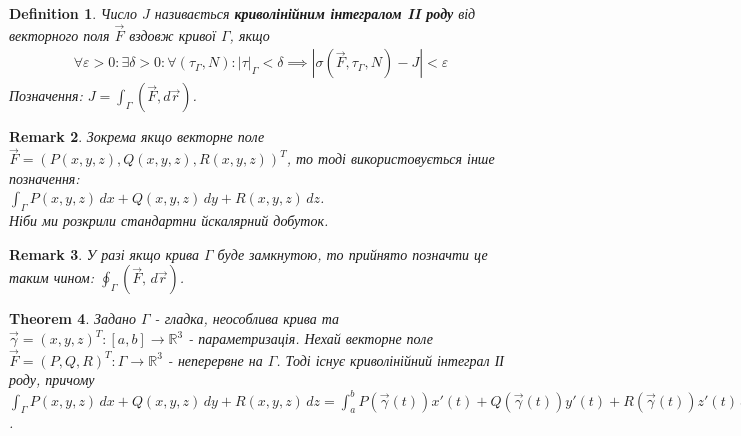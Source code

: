 \documentclass[a4paper, 10pt]{article}
\theoremstyle{theoremdd}
\newtheorem{theorem}{Theorem}[subsection]
\theoremstyle{theoremdd}
\newtheorem{definition}[theorem]{Definition}
\theoremstyle{theoremdd}
\theoremstyle{theoremdd}
\theoremstyle{theoremdd}
\theoremstyle{theoremdd}
\theoremstyle{theoremdd}
\theoremstyle{theoremdd}
\theoremstyle{theoremdd}
\newtheorem{proposition}[theorem]{Proposition}
\theoremstyle{theoremdd}
\theoremstyle{theoremdd}
\newtheorem{remark}[theorem]{Remark}
\theoremstyle{theoremdd}
\theoremstyle{theoremdd}
\theoremstyle{theoremdd}
\theoremstyle{theoremdd}
\newcommand\Norm[1]{\left\lVert#1\right\rVert}
\begin{document}
\begin{definition}
Число $J$ називається \textbf{криволінійним інтегралом II роду} від векторного поля $\vec{F}$ вздовж кривої $\Gamma$, якщо
\begin{align*}
\forall \varepsilon > 0: \exists \delta > 0: \forall (\tau_\Gamma, N): |\tau|_\Gamma < \delta \implies |\sigma(\vec{F},\tau_\Gamma, N) - J| < \varepsilon
\end{align*}
Позначення: $J = \displaystyle\int_\Gamma (\vec{F}, d\vec{r})$.
\end{definition}

\iffalse
\begin{proposition}
$\displaystyle\int_{\Gamma} (\vec{F},d\vec{r}) = \int_{\Gamma} (\vec{F}, \vec{l})\,dl$.\\
Тепер тут $(\vec{F},\vec{l}) (x,y,z)$ - це скалярна функція $\Gamma \to \mathbb{R}$, а також $\vec{l}(\vec{\gamma}(t)) = \dfrac{\vec{\gamma}'(t)}{\Norm{\vec{\gamma}'(t)}}$.
\end{proposition}
\fi

\begin{remark}
Зокрема якщо векторне поле $\vec{F} = ( P(x,y,z), Q(x,y,z), R(x,y,z) )^T$, то тоді використовується інше позначення:\\
$\displaystyle\int_\Gamma P(x,y,z)\,dx + Q(x,y,z)\,dy + R(x,y,z)\,dz$.\\
Ніби ми розкрили стандартни йскалярний добуток.
\end{remark}

\begin{remark}
У разі якщо крива $\Gamma$ буде замкнутою, то прийнято позначти це таким чином: $\displaystyle\oint_\Gamma (\vec{F}, \,d\vec{r})$.
\end{remark}

\begin{theorem}
Задано $\Gamma$ - гладка, неособлива крива та $\vec{\gamma} = (x,y,z)^T: [a,b] \to \mathbb{R}^3$ - параметризація. Нехай векторне поле $\vec{F} = (P,Q,R)^T: \Gamma \to \mathbb{R}^3$ - неперервне на $\Gamma$. Тоді існує криволінійний інтеграл ІІ роду, причому\\
$\displaystyle\int_\Gamma P(x,y,z)\,dx + Q(x,y,z)\,dy + R(x,y,z)\,dz = \int_a^b P(\vec{\gamma}(t))x'(t) + Q(\vec{\gamma}(t))y'(t) + R(\vec{\gamma}(t))z'(t)\,dt$.
\end{theorem}
\end{document}
